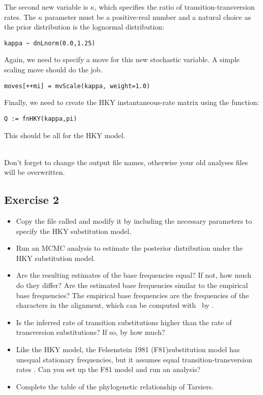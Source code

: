 The second new variable is $\kappa$, which specifies the ratio of transition-transversion rates.
The $\kappa$ parameter must be a positive-real number and a natural choice as the prior distribution is the lognormal distribution:
{\tt \begin{snugshade*}
\begin{lstlisting}
kappa ~ dnLnorm(0.0,1.25)
\end{lstlisting}
\end{snugshade*}}
Again, we need to specify a move for this new stochastic variable.
A simple scaling move should do the job.
{\tt \begin{snugshade*}
\begin{lstlisting}
moves[++mi] = mvScale(kappa, weight=1.0)
\end{lstlisting}
\end{snugshade*}}

Finally, we need to create the HKY instantaneous-rate matrix using the  function:
{\tt \begin{snugshade*}
\begin{lstlisting}
Q := fnHKY(kappa,pi)
\end{lstlisting}
\end{snugshade*}}
This should be all for the HKY model.

\noindent \\ \impmark Don't forget to change the output file names, otherwise your old analyses files will be overwritten.

\subsection{Exercise 2}

\begin{itemize}
\item Copy the file called   and modify it by including the necessary parameters to specify the HKY substitution model.
\item Run an MCMC analysis to estimate the posterior distribution under the HKY substitution model.
\item Are the resulting estimates of the base frequencies equal? 
	If not, how much do they differ? 
	Are the estimated base frequencies similar to the empirical base frequencies? 
	The empirical base frequencies are the frequencies of the characters in the alignment, which can be computed with \RevBayes~by .
\item Is the inferred rate of transition substitutions higher than the rate of transversion substitutions? If so, by how much?
\item Like the HKY model, the Felsenstein 1981 (F81)substitution model has unequal stationary frequencies, but it assumes equal transition-transversion rates \citep{Felsenstein1981}.
	Can you set up the F81 model and run an analysis?
\item Complete the table of the phylogenetic relationship of Tarsiers.
\end{itemize}






